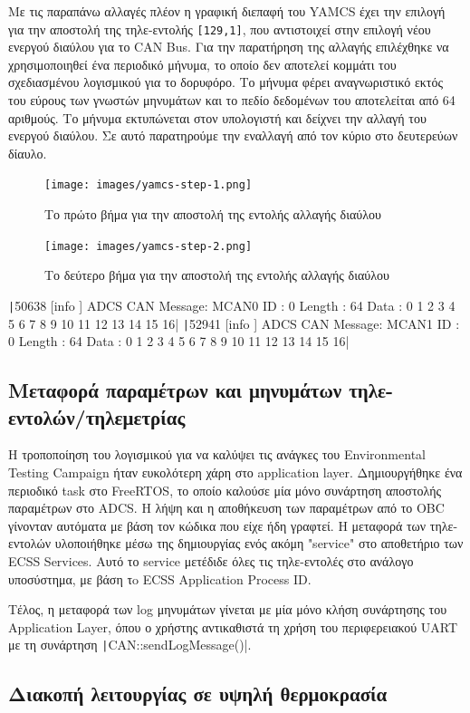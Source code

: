 \documentclass[a4paper,nobib,justified]{tufte-book}
\begin{document}
Με τις παραπάνω αλλαγές πλέον η γραφική διεπαφή του YAMCS έχει την επιλογή για την αποστολή της τηλε-εντολής \texttt{[129,1]}, που αντιστοιχεί στην επιλογή νέου ενεργού διαύλου για το CAN Bus. Για την  παρατήρηση της αλλαγής επιλέχθηκε να χρησιμοποιηθεί ένα περιοδικό μήνυμα, το οποίο δεν αποτελεί κομμάτι του σχεδιασμένου λογισμικού για το δορυφόρο. Το μήνυμα φέρει αναγνωριστικό εκτός του εύρους των γνωστών μηνυμάτων και το πεδίο δεδομένων του αποτελείται από 64 αριθμούς. Το μήνυμα εκτυπώνεται στον υπολογιστή και δείχνει την αλλαγή του ενεργού διαύλου. Σε αυτό παρατηρούμε την εναλλαγή από τον κύριο στο δευτερεύων δίαυλο.

\begin{figure}
	\texttt{[image: images/yamcs-step-1.png]}
	\label{fig:yamcs-step-1}
	\caption{Το πρώτο βήμα για την αποστολή της εντολής αλλαγής διαύλου}
\end{figure}
\begin{figure}
	\texttt{[image: images/yamcs-step-2.png]}
	\label{fig:yamcs-step-2}
	\caption{Το δεύτερο βήμα για την αποστολή της εντολής αλλαγής διαύλου}
\end{figure}

\texttt|50638 [info     ] ADCS     CAN Message: MCAN0 ID : 0 Length : 64 Data : 0 1 2 3 4 5 6 7 8 9 10 11 12 13 14 15 16|
\texttt|52941 [info     ] ADCS     CAN Message: MCAN1 ID : 0 Length : 64 Data : 0 1 2 3 4 5 6 7 8 9 10 11 12 13 14 15 16|

\subsection{Μεταφορά παραμέτρων και μηνυμάτων τηλε-εντολών/τηλεμετρίας}
Η τροποποίηση του λογισμικού για να καλύψει τις ανάγκες του Environmental Testing Campaign ήταν ευκολότερη χάρη στο application layer. Δημιουργήθηκε ένα περιοδικό task στο FreeRTOS, το οποίο καλούσε μία μόνο συνάρτηση αποστολής παραμέτρων στο ADCS. Η λήψη και η αποθήκευση των παραμέτρων από το OBC γίνονταν αυτόματα με βάση τον κώδικα που είχε ήδη γραφτεί. Η μεταφορά των τηλε-εντολών υλοποιήθηκε μέσω της δημιουργίας ενός ακόμη "service" στο αποθετήριο των ECSS Services. Αυτό το service μετέδιδε όλες τις τηλε-εντολές στο ανάλογο υποσύστημα, με βάση τo ECSS Application Process ID.

Τέλος, η μεταφορά των log μηνυμάτων γίνεται με μία μόνο κλήση συνάρτησης του Application Layer, όπου ο χρήστης αντικαθιστά τη χρήση του περιφερειακού UART με τη συνάρτηση \texttt|CAN::sendLogMessage()|.
\subsection{Διακοπή λειτουργίας σε υψηλή θερμοκρασία}
\end{document}
